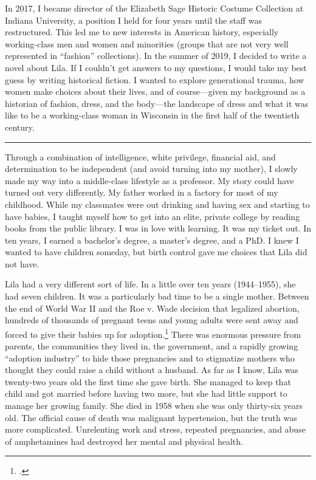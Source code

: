 \documentclass[
  letterpaper,
]{book}
\begin{document}
In 2017, I became director of the Elizabeth Sage Historic Costume
Collection at Indiana University, a position I held for four years until
the staff was restructured. This led me to new interests in American
history, especially working-class men and women and minorities (groups
that are not very well represented in ``fashion'' collections). In the
summer of 2019, I decided to write a novel about Lila. If I couldn't get
answers to my questions, I would take my best guess by writing
historical fiction. I wanted to explore generational trauma, how women
make choices about their lives, and of course---given my background as a
historian of fashion, dress, and the body---the landscape of dress and
what it was like to be a working-class woman in Wisconsin in the first
half of the twentieth century.

\begin{center}\rule{0.5\linewidth}{0.5pt}\end{center}

Through a combination of intelligence, white privilege, financial aid,
and determination to be independent (and avoid turning into my mother),
I slowly made my way into a middle-class lifestyle as a professor. My
story could have turned out very differently. My father worked in a
factory for most of my childhood. While my classmates were out drinking
and having sex and starting to have babies, I taught myself how to get
into an elite, private college by reading books from the public library.
I was in love with learning. It was my ticket out. In ten years, I
earned a bachelor's degree, a master's degree, and a PhD. I knew I
wanted to have children someday, but birth control gave me choices that
Lila did not have.

Lila had a very different sort of life. In a little over ten years
(1944--1955), she had seven children. It was a particularly bad time to
be a single mother. Between the end of World War II and the Roe v. Wade
decision that legalized abortion, hundreds of thousands of pregnant
teens and young adults were sent away and forced to give their babies up
for adoption.\footnote{.} There was enormous
pressure from parents, the communities they lived in, the government,
and a rapidly growing ``adoption industry'' to hide those pregnancies
and to stigmatize mothers who thought they could raise a child without a
husband. As far as I know, Lila was twenty-two years old the first time
she gave birth. She managed to keep that child and got married before
having two more, but she had little support to manage her growing
family. She died in 1958 when she was only thirty-six years old. The
official cause of death was malignant hypertension, but the truth was
more complicated. Unrelenting work and stress, repeated pregnancies, and
abuse of amphetamines had destroyed her mental and physical health.
\end{document}
